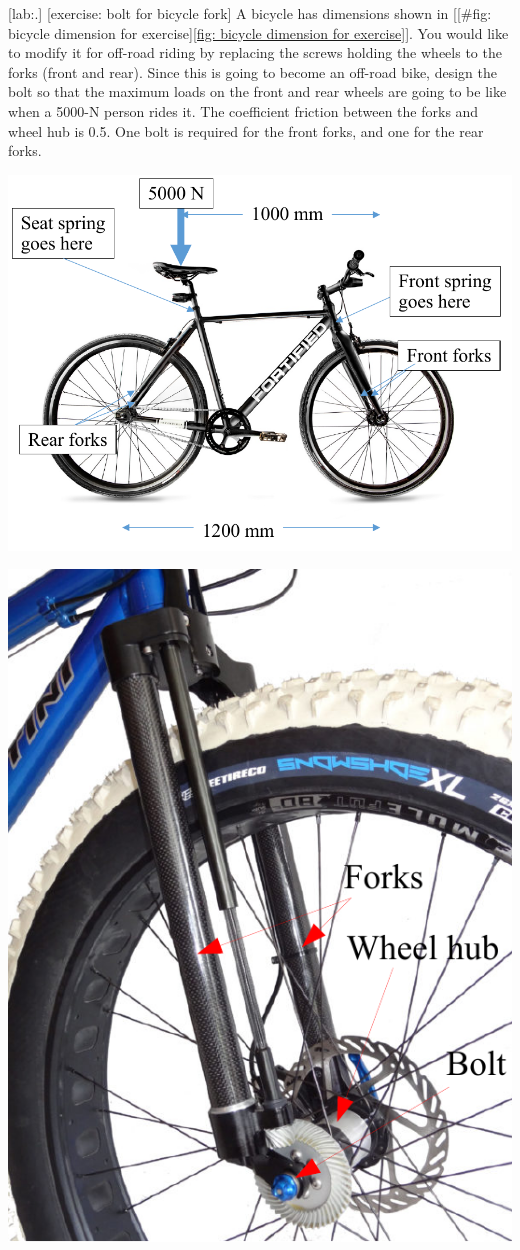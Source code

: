 \documentclass[a4paper,openany,12pt]{book}
\begin{document}
{{[lab:.]
[exercise: bolt for bicycle fork] A bicycle has dimensions shown in
[[\#fig: bicycle dimension for exercise]\ref{fig: bicycle dimension for exercise}].
You would like to modify it for off-road riding by replacing the screws
holding the wheels to the forks (front and rear). Since this is going to
become an off-road bike, design the bolt so that the maximum loads on
the front and rear wheels are going to be like when a 5000-N person
rides it. The coefficient friction between the forks and wheel hub is
0.5. One bolt is required for the front forks, and one for the rear
forks.


\begin{center}
\includegraphics[width=.9\linewidth]{pictures/Bolt/bicycle-dimension.pdf}
\label{fig: bicycle dimension for exercise}
\end{center}
\begin{center}
\includegraphics[width=.9\linewidth]{pictures/Bolt/bicycle-fork.pdf}

\end{center}}}
\end{document}
